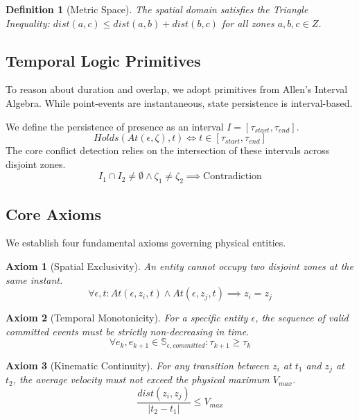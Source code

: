\documentclass[conference]{IEEEtran}
\newtheorem{definition}{Definition}
\newtheorem{axiom}{Axiom}
\begin{document}
\begin{definition}[Metric Space]
The spatial domain satisfies the Triangle Inequality:
$dist(a, c) \le dist(a, b) + dist(b, c)$ for all zones $a, b, c \in Z$.
\end{definition}

\subsection{Temporal Logic Primitives}

To reason about duration and overlap, we adopt primitives from Allen's Interval Algebra. While point-events are instantaneous, state persistence is interval-based.

We define the persistence of presence as an interval $I = [\tau_{start}, \tau_{end}]$.
\begin{equation}
Holds(At(\epsilon, \zeta), t) \iff t \in [\tau_{start}, \tau_{end}]
\end{equation}
The core conflict detection relies on the intersection of these intervals across disjoint zones.
\begin{equation}
I_1 \cap I_2 \neq \emptyset \land \zeta_1 \neq \zeta_2 \implies \text{Contradiction}
\end{equation}

\subsection{Core Axioms}
We establish four fundamental axioms governing physical entities.

\begin{axiom}[Spatial Exclusivity]
An entity cannot occupy two disjoint zones at the same instant.
\begin{equation}
\forall \epsilon, t: At(\epsilon, z_i, t) \land At(\epsilon, z_j, t) \implies z_i = z_j
\end{equation}
\end{axiom}

\begin{axiom}[Temporal Monotonicity]
For a specific entity $\epsilon$, the sequence of valid \textit{committed} events must be strictly non-decreasing in time.
\begin{equation}
\forall e_k, e_{k+1} \in \mathbb{S}_{\epsilon, committed}: \tau_{k+1} \ge \tau_k
\end{equation}
\end{axiom}

\begin{axiom}[Kinematic Continuity]
For any transition between $z_i$ at $t_1$ and $z_j$ at $t_2$, the average velocity must not exceed the physical maximum $V_{max}$.
\begin{equation}
\frac{dist(z_i, z_j)}{|t_2 - t_1|} \le V_{max}
\end{equation}
\end{axiom}
\end{document}
